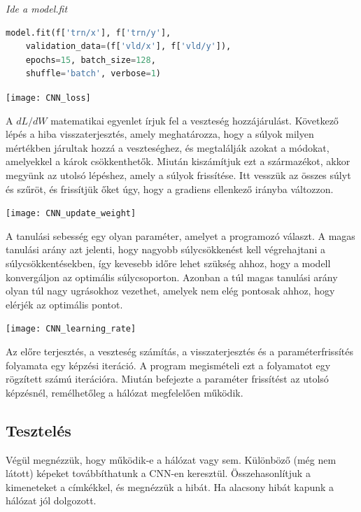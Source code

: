 \textit{Ide a model.fit}

\begin{lstlisting}[language=Python]
model.fit(f['trn/x'], f['trn/y'],	
	validation_data=(f['vld/x'], f['vld/y']),
	epochs=15, batch_size=128,
	shuffle='batch', verbose=1)
\end{lstlisting}

\begin{center}
\texttt{[image: CNN\_loss]}
\end{center}

A $dL/dW$ matematikai egyenlet írjuk fel a veszteség hozzájárulást. Következő lépés a hiba visszaterjesztés, amely meghatározza, hogy a súlyok milyen mértékben járultak hozzá a veszteséghez, és megtalálják azokat a módokat, amelyekkel a károk csökkenthetők. Miután kiszámítjuk ezt a származékot, akkor megyünk az utolsó lépéshez, amely a súlyok frissítése. Itt vesszük az összes súlyt és szűröt, és frissítjük őket úgy, hogy a gradiens ellenkező irányba változzon.

\begin{center}
\texttt{[image: CNN\_update\_weight]}
\end{center}

A tanulási sebesség egy olyan paraméter, amelyet a programozó választ. A magas tanulási arány azt jelenti, hogy nagyobb súlycsökkenést kell végrehajtani a súlycsökkentésekben, így kevesebb időre lehet szükség ahhoz, hogy a modell konvergáljon az optimális súlycsoporton. Azonban a túl magas tanulási arány olyan túl nagy ugrásokhoz vezethet, amelyek nem elég pontosak ahhoz, hogy elérjék az optimális pontot.

\begin{center}
\texttt{[image: CNN\_learning\_rate]}
\end{center}

Az előre terjesztés, a veszteség számítás, a visszaterjesztés és a paraméterfrissítés folyamata egy képzési iteráció. A program megismételi ezt a folyamatot egy rögzített számú iterációra. Miután befejezte a paraméter frissítést az utolsó képzésnél, remélhetőleg a hálózat megfelelően működik.

\subsection{Tesztelés}

Végül megnézzük, hogy működik-e a hálózat vagy sem. Különböző (még nem látott) képeket továbbíthatunk a CNN-en keresztül. Összehasonlítjuk a kimeneteket a címkékkel, és megnézzük a hibát. Ha alacsony hibát kapunk a hálózat jól dolgozott.

